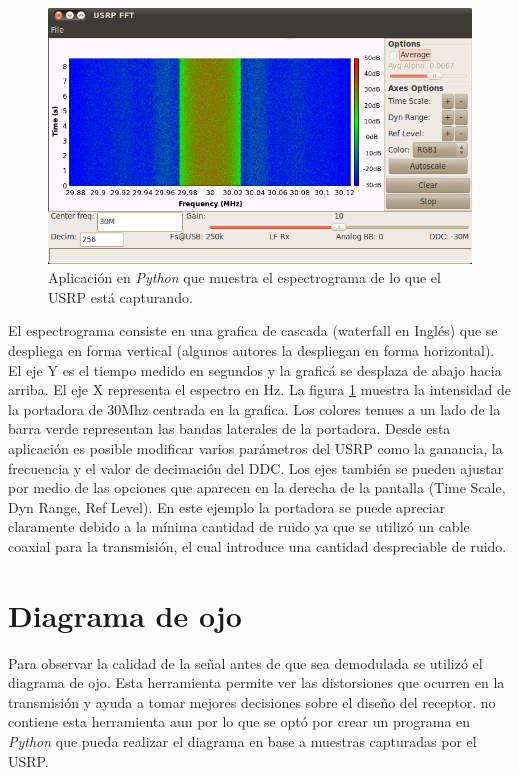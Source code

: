 \begin{figure}[htp]
  \centering
  \includegraphics[scale=0.7]{figs/spectrogramgui}
  \vspace{0.3in}
  \caption{Aplicaci\'on en \emph{Python} que muestra el espectrograma de lo que el USRP est\'a capturando.}
  \label{fig:spectrogramgui}
\end{figure}

El espectrograma consiste en una grafica de cascada (waterfall en Ingl\'es) que se despliega en
forma vertical (algunos autores la despliegan en forma horizontal). El eje Y es el tiempo medido en
segundos y la grafic\'a se desplaza de abajo hacia arriba. El eje X representa el espectro en Hz. La
figura \ref{fig:spectrogramgui} muestra la intensidad de la portadora de 30Mhz centrada en la
grafica. Los colores tenues a un lado de la barra verde representan las bandas laterales de la
portadora. Desde esta aplicaci\'on es posible modificar varios par\'ametros del USRP como la
ganancia, la frecuencia y el valor de decimaci\'on del DDC. Los ejes tambi\'en se pueden ajustar por
medio de las opciones que aparecen en la derecha de la pantalla (Time Scale, Dyn Range, Ref Level).
En este ejemplo la portadora se puede apreciar claramente debido a la m\'inima cantidad de ruido ya que se
utiliz\'o un cable coaxial para la transmisi\'on, el cual introduce una cantidad despreciable de ruido.

\section{Diagrama de ojo}

Para observar la calidad de la se\~nal antes de que sea demodulada se utiliz\'o el diagrama de
ojo. Esta herramienta permite ver las distorsiones que ocurren en la transmisi\'on y ayuda a
tomar mejores decisiones sobre el dise\~no del receptor. \gnuradio no contiene esta
herramienta aun por lo que se opt\'o por crear un programa en \emph{Python} que pueda realizar el diagrama en
base a muestras capturadas por el USRP.

